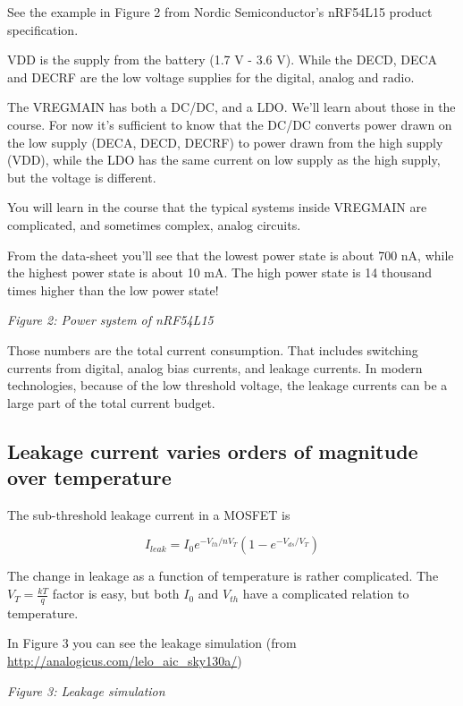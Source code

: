 See the example in Figure 2 from Nordic Semiconductor's nRF54L15 product
specification.

VDD is the supply from the battery (1.7 V - 3.6 V). While the DECD, DECA
and DECRF are the low voltage supplies for the digital, analog and
radio.

The VREGMAIN has both a DC/DC, and a LDO. We'll learn about those in the
course. For now it's sufficient to know that the DC/DC converts power
drawn on the low supply (DECA, DECD, DECRF) to power drawn from the high
supply (VDD), while the LDO has the same current on low supply as the
high supply, but the voltage is different.

You will learn in the course that the typical systems inside VREGMAIN
are complicated, and sometimes complex, analog circuits.

From the data-sheet you'll see that the lowest power state is about 700
nA, while the highest power state is about 10 mA. The high power state
is 14 thousand times higher than the low power state!


{
\centering
{}
}

\emph{Figure 2: Power system of nRF54L15 }

Those numbers are the total current consumption. That includes switching
currents from digital, analog bias currents, and leakage currents. In
modern technologies, because of the low threshold voltage, the leakage
currents can be a large part of the total current budget.

\subsection{Leakage current varies orders of magnitude over
temperature}\label{leakage-current-varies-orders-of-magnitude-over-temperature}

The sub-threshold leakage current in a MOSFET is

\[I_{leak} = I_0 e^{-V_{th}/n V_T} \left(1 - e^{-V_{ds}/V_T}\right)\]

The change in leakage as a function of temperature is rather
complicated. The \(V_T = \frac{k T}{q}\) factor is easy, but both
\(I_0\) and \(V_{th}\) have a complicated relation to temperature.

In Figure 3 you can see the leakage simulation (from
\url{http://analogicus.com/lelo_aic_sky130a/})


{
\centering
{}
}

\emph{Figure 3: Leakage simulation }

